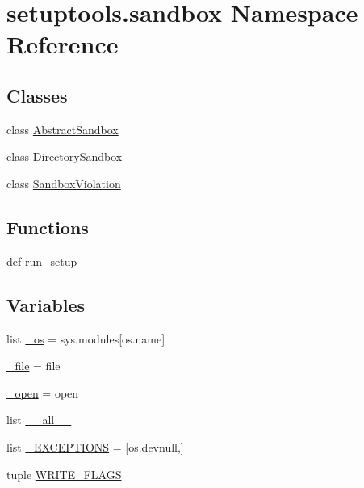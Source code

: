 \hypertarget{namespacesetuptools_1_1sandbox}{}\section{setuptools.\+sandbox Namespace Reference}
\label{namespacesetuptools_1_1sandbox}
\subsection*{Classes}
\begin{DoxyCompactItemize}
\item 
class \hyperlink{classsetuptools_1_1sandbox_1_1AbstractSandbox}{Abstract\+Sandbox}
\item 
class \hyperlink{classsetuptools_1_1sandbox_1_1DirectorySandbox}{Directory\+Sandbox}
\item 
class \hyperlink{classsetuptools_1_1sandbox_1_1SandboxViolation}{Sandbox\+Violation}
\end{DoxyCompactItemize}
\subsection*{Functions}
\begin{DoxyCompactItemize}
\item 
def \hyperlink{namespacesetuptools_1_1sandbox_a83b76a3b7eab57c0df1fad1dfe7b60c5}{run\+\_\+setup}
\end{DoxyCompactItemize}
\subsection*{Variables}
\begin{DoxyCompactItemize}
\item 
list \hyperlink{namespacesetuptools_1_1sandbox_a63c511133e8c157ec2dbefeac87a0f85}{\+\_\+os} = sys.\+modules\mbox{[}os.\+name\mbox{]}
\item 
\hyperlink{namespacesetuptools_1_1sandbox_a606d2df05a9166bff220807da3b98823}{\+\_\+file} = file
\item 
\hyperlink{namespacesetuptools_1_1sandbox_a616fa17a666518a02267233ecdc9df33}{\+\_\+open} = open
\item 
list \hyperlink{namespacesetuptools_1_1sandbox_a866546c157bec8341d08592db0cd0277}{\+\_\+\+\_\+all\+\_\+\+\_\+}
\item 
list \hyperlink{namespacesetuptools_1_1sandbox_aa68adb36abe8accb61bfff7f33e49462}{\+\_\+\+E\+X\+C\+E\+P\+T\+I\+O\+N\+S} = \mbox{[}os.\+devnull,\mbox{]}
\item 
tuple \hyperlink{namespacesetuptools_1_1sandbox_addf2b2626fe8f6ada55604935edd0f24}{W\+R\+I\+T\+E\+\_\+\+F\+L\+A\+G\+S}
\end{DoxyCompactItemize}


